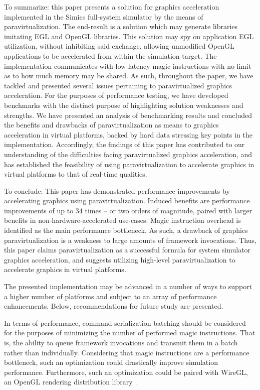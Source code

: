 To summarize: this paper presents a solution for graphics acceleration implemented in the Simics full-system simulator by the means of paravirtualization.
The end-result is a solution which may generate libraries imitating EGL and OpenGL libraries.
This solution may spy on application EGL utilization, without inhibiting said exchange, allowing unmodified OpenGL applications to be accelerated from within the simulation target.
The implementation communicates with low-latency magic instructions with no limit as to how much memory may be shared.
As such, throughout the paper, we have tackled and presented several issues pertaining to paravirtualized graphics acceleration.
For the purposes of performance testing, we have developed benchmarks with the distinct purpose of highlighting solution weaknesses and strengths.
We have presented an analysis of benchmarking results and concluded the benefits and drawbacks of paravirtualization as means to graphics acceleration in virtual platforms, backed by hard data stressing key points in the implementation.
Accordingly, the findings of this paper has contributed to our understanding of the difficulties facing paravirtualized graphics acceleration, and has established the feasibility of using paravirtualization to accelerate graphics in virtual platforms to that of real-time qualities.

To conclude: This paper has demonstrated performance improvements by accelerating graphics using paravirtualization.
Induced benefits are performance improvements of up to $34$ times -- or two orders of magnitude, paired with larger benefits in non-hardware-accelerated use-cases.
Magic instruction overhead is identified as the main performance bottleneck.
As such, a drawback of graphics paravirtualization is a weakness to large amounts of framework invocations.
Thus, this paper claims paravirtualization as a successful formula for system simulator graphics acceleration, and suggests utilizing high-level paravirtualization to accelerate graphics in virtual platforms.

The presented implementation may be advanced in a number of ways to support a higher number of platforms and subject to an array of performance enhancements.
Below, recommendations for future study are presented.

In terms of performance, command serialization batching should be considered for the purposes of minimizing the number of performed magic instructions.
That is, the ability to queue framework invocations and transmit them in a batch rather than individually.
Considering that magic instructions are a performance bottleneck, such an optimization could drastically improve simulation performance.
Furthermore, such an optimization could be paired with WireGL, an OpenGL rendering distribution library~.

